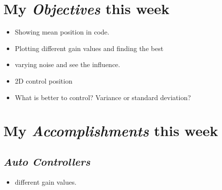 \newcommand{\handoutName}{Weekly report}
\newcommand{\handoutdate}{Nov 18, 2014}
\newcommand{\duedate}{}


\section{My \emph{Objectives} this week}
\begin{itemize}
\item Showing mean position in code.
\item Plotting different gain values and finding the best
\item varying noise and see the influence.
\item 2D control position
\item What is better to control? Variance or standard deviation?
\end{itemize}


\section{My \emph{Accomplishments} this week}

\subsection{\emph{Auto Controllers}}

\begin{itemize}
\item different gain values.
\end{itemize}

